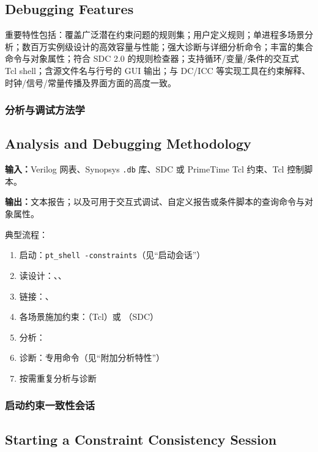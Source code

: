 \subsection*{Debugging Features}

重要特性包括：覆盖广泛潜在约束问题的规则集；用户定义规则；单进程多场景分析；数百万实例级设计的高效容量与性能；强大诊断与详细分析命令；丰富的集合命令与对象属性；符合 SDC 2.0 的规则检查器；支持循环/变量/条件的交互式 Tcl shell；含源文件名与行号的 GUI 输出；与 DC/ICC 等实现工具在约束解释、时钟/信号/常量传播及界面方面的高度一致。

\subsubsection{分析与调试方法学}
\subsection*{Analysis and Debugging Methodology}

\textbf{输入：}Verilog 网表、Synopsys \texttt{.db} 库、SDC 或 PrimeTime Tcl 约束、Tcl 控制脚本。

\textbf{输出：}文本报告；以及可用于交互式调试、自定义报告或条件脚本的查询命令与对象属性。

典型流程：
\begin{enumerate}
  \item 启动：\texttt{pt\_shell -constraints}（见“启动会话”）
  \item 读设计：、、
  \item 链接：、
  \item 各场景施加约束：（Tcl）或 （SDC）
  \item 分析：
  \item 诊断：专用命令（见“附加分析特性”）
  \item 按需重复分析与诊断
\end{enumerate}


\subsubsection{启动约束一致性会话}
\subsection*{Starting a Constraint Consistency Session}

